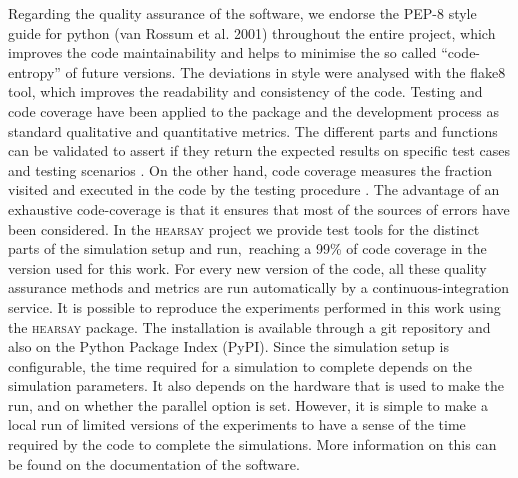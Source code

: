 \documentclass[crop]{CSLB}
\newcommand{\hs}{\textsc{hearsay}}
\begin{document}
%
Regarding the quality assurance of the software, we endorse the PEP-8 style
guide for python (van Rossum et al. 2001) throughout the entire project, which
improves the code maintainability and helps to minimise the so called
``code-entropy'' of future versions.
%
The deviations in style were analysed with the flake8 tool, which improves the
readability and consistency of the code.
%
Testing and code coverage have been applied to the package and the development
process as standard qualitative and quantitative metrics.
%
The different parts and functions can be validated to assert if they return the
expected results on specific test cases and testing scenarios
\citep{jazayeri_engeneering_2007}.
%
On the other hand, code coverage measures the fraction visited and executed in
the code by the testing procedure \citep{miller_testing_1963}.
%
The advantage of an exhaustive code-coverage is that it ensures that most of
the sources of errors have been considered.
%
In the \hs{} project we provide test tools for the distinct parts of the
simulation setup and run, reaching a 99\% of code coverage in the version used
for this work.
%
For every new version of the code, all these quality assurance methods and
metrics are run automatically by a continuous-integration service.
%
It is possible to reproduce the experiments performed in this work using the
\hs{} package.
%
The installation is available through a git repository and also on the Python
Package Index (PyPI).
%
Since the simulation setup is configurable, the time required for a simulation
to complete depends on the simulation parameters.
%
It also depends on the hardware that is used to make the run, and on whether
the parallel option is set.
%
However, it is simple to make a local run of limited versions of the
experiments to have a sense of the time required by the code to complete the
simulations.
%
More information on this can be found on the documentation of the software.
\end{document}

